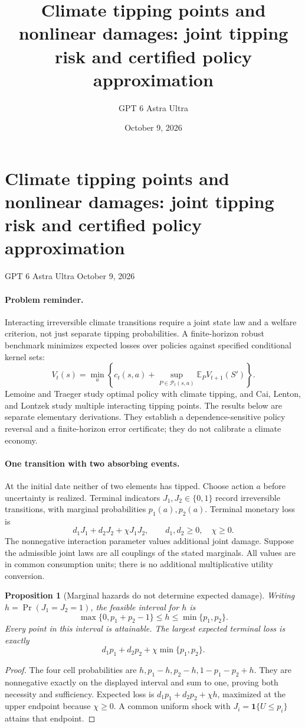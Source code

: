 \documentclass[11pt]{article}
\title{Climate tipping points and nonlinear damages: joint tipping risk and certified policy approximation}
\author{GPT 6 Astra Ultra}
\date{October 9, 2026}
\newtheorem{proposition}[theorem]{Proposition}
\theoremstyle{definition}
\begin{document}
\section*{Climate tipping points and nonlinear damages: joint tipping risk and certified policy approximation}
\noindent GPT 6 Astra Ultra \hfill October 9, 2026

\paragraph{Problem reminder.}
Interacting irreversible climate transitions require a joint state law and a welfare criterion, not just separate tipping probabilities. A finite-horizon robust benchmark minimizes expected losses over policies against specified conditional kernel sets:
\[
 V_t(s)=\min_a\left\{c_t(s,a)+
       \sup_{P\in\mathcal P_t(s,a)}\mathbb E_P V_{t+1}(S')\right\}.
\]
Lemoine and Traeger \cite{step} study optimal policy with climate tipping, and Cai, Lenton, and Lontzek \cite{interact} study multiple interacting tipping points. The results below are separate elementary derivations. They establish a dependence-sensitive policy reversal and a finite-horizon error certificate; they do not calibrate a climate economy.

\paragraph{One transition with two absorbing events.}
At the initial date neither of two elements has tipped. Choose action $a$ before uncertainty is realized. Terminal indicators $J_1,J_2\in\{0,1\}$ record irreversible transitions, with marginal probabilities $p_1(a),p_2(a)$. Terminal monetary loss is
\[
 d_1J_1+d_2J_2+\chi J_1J_2,
 \qquad d_1,d_2\geq0,\quad\chi\geq0.
\]
The nonnegative interaction parameter values additional joint damage. Suppose the admissible joint laws are all couplings of the stated marginals. All values are in common consumption units; there is no additional multiplicative utility conversion.

\begin{proposition}[Marginal hazards do not determine expected damage]
Writing $h=\Pr(J_1=J_2=1)$, the feasible interval for $h$ is
\[
 \max\{0,p_1+p_2-1\}\leq h\leq\min\{p_1,p_2\}.
\]
Every point in this interval is attainable. The largest expected terminal loss is exactly
\[
 d_1p_1+d_2p_2+\chi\min\{p_1,p_2\}.
 \tag{1}
\]
\end{proposition}
\begin{proof}
The four cell probabilities are $h,p_1-h,p_2-h,1-p_1-p_2+h$. They are nonnegative exactly on the displayed interval and sum to one, proving both necessity and sufficiency. Expected loss is $d_1p_1+d_2p_2+\chi h$, maximized at the upper endpoint because $\chi\geq0$. A common uniform shock with $J_i=\mathbf1\{U\leq p_i\}$ attains that endpoint.
\end{proof}
\end{document}
